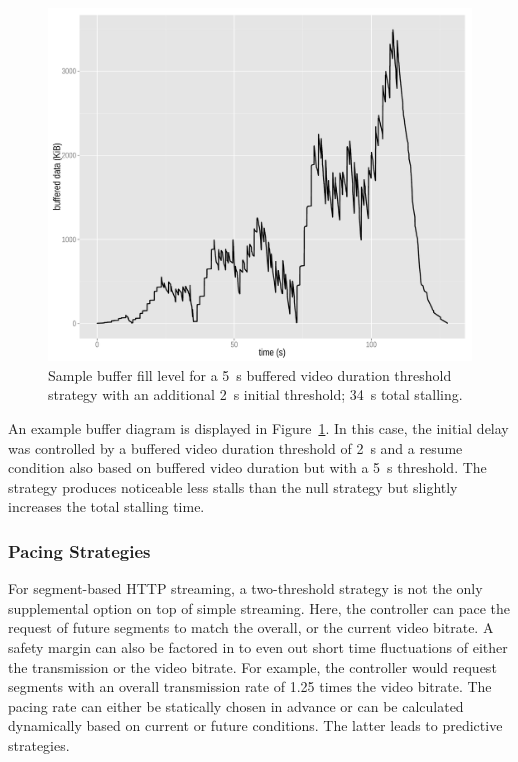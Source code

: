 \begin{figure}[htb]
	\centering
	\includegraphics[width=1.0\textwidth]{images/R-bufferlevel-flash.pdf}
	\caption{Sample buffer fill level for a \SI{5}{\second} buffered video duration threshold strategy with an additional \SI{2}{\second} initial threshold; \SI{34}{\second} total stalling.}
\label{c3:fig:bufferlevel-flash}
\end{figure}

An example buffer diagram is displayed in Figure~\ref{c3:fig:bufferlevel-flash}. In this case, the initial delay was controlled by a buffered video duration threshold of \SI{2}{\second} and a resume condition also based on buffered video duration but with a \SI{5}{\second} threshold. The strategy produces noticeable less stalls than the null strategy but slightly increases the total stalling time.


\subsubsection{Pacing Strategies}

For segment-based \gls{HTTP} streaming, a two-threshold strategy is not the only supplemental option on top of simple streaming. Here, the controller can pace the request of future segments to match the overall, or the current video bitrate. A safety margin can also be factored in to even out short time fluctuations of either the transmission or the video bitrate. For example, the controller would request segments with an overall transmission rate of 1.25 times the video bitrate. The pacing rate can either be statically chosen in advance or can be calculated dynamically based on current or future conditions. The latter leads to predictive strategies.


